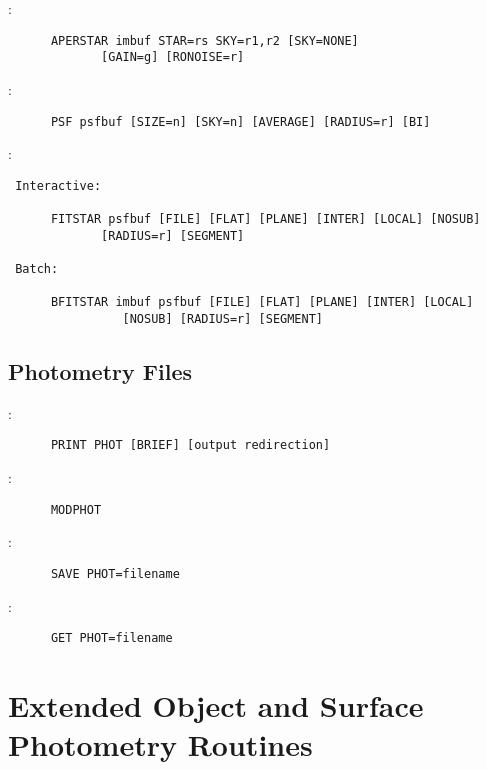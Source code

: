 :
\begin{verbatim}
      APERSTAR imbuf STAR=rs SKY=r1,r2 [SKY=NONE]
		     [GAIN=g] [RONOISE=r]
\end{verbatim}

\noindent {}:
\begin{verbatim}
      PSF psfbuf [SIZE=n] [SKY=n] [AVERAGE] [RADIUS=r] [BI]
\end{verbatim}

\noindent {}:
\begin{verbatim}
 Interactive:

      FITSTAR psfbuf [FILE] [FLAT] [PLANE] [INTER] [LOCAL] [NOSUB]
		     [RADIUS=r] [SEGMENT]

 Batch:

      BFITSTAR imbuf psfbuf [FILE] [FLAT] [PLANE] [INTER] [LOCAL]
			    [NOSUB] [RADIUS=r] [SEGMENT]
\end{verbatim}

\subsection{Photometry Files}

:
\begin{verbatim}
      PRINT PHOT [BRIEF] [output redirection]
\end{verbatim}

\noindent {}:
\begin{verbatim}
      MODPHOT
\end{verbatim}

\noindent {}:
\begin{verbatim}
      SAVE PHOT=filename
\end{verbatim}

\noindent {}:
\begin{verbatim}
      GET PHOT=filename
\end{verbatim}


\section{Extended Object and Surface Photometry Routines}

